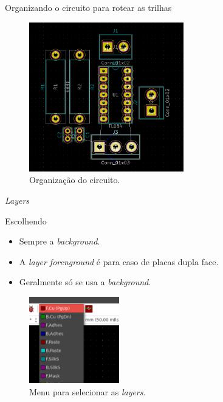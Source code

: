 \documentclass{beamer}
\begin{document}
\begin{frame}{Organizando o circuito para rotear as trilhas}
	\begin{figure}
		\centering
		\includegraphics[width=0.6\textwidth]{Imagens/32_organizacao_circuito.png}
		\caption{Organização do circuito.}
	\end{figure}
\end{frame}

\begin{frame}{\textit{Layers}}
	\begin{block}{Escolhendo}
		\begin{itemize}
			\item Sempre a \textit{background}.
			\item A \textit{layer forenground} é para caso de placas dupla face.
			\item Geralmente só se usa a \textit{background}.
		\end{itemize}
	\end{block}
	\begin{figure}
		\centering
		\includegraphics[width=0.35\textwidth]{Imagens/33_layers.png}
		\caption{Menu para selecionar as \textit{layers}.}
	\end{figure}
\end{frame}
\end{document}
